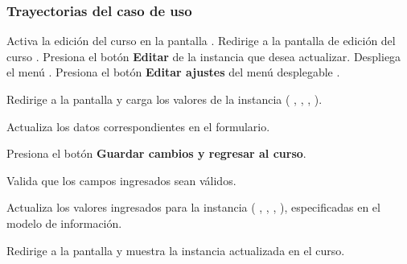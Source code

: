 \begin{UseCase}
{	}








\end{UseCase}

\subsubsection{Trayectorias del caso de uso}

\begin{UCtrayectoria}%
%

    \Actor Activa la edición del curso en la pantalla .
    \Sistema Redirige a la pantalla de edición del curso .
    \Actor Presiona el botón {\bf Editar} de la instancia que desea actualizar.
    \Sistema Despliega el menú .
    \Actor Presiona el botón {\bf Editar ajustes} del menú desplegable .

    \Sistema Redirige a la pantalla  y carga los valores de la instancia  (
      ,
      ,
      ,
      ).

    \label{CU-C02-muestra-pantalla}

    \Actor Actualiza los datos correspondientes en el formulario.

    \Actor Presiona el botón {\bf Guardar cambios y regresar al curso}. 

    \Sistema Valida que los campos ingresados sean válidos.  

    \Sistema Actualiza los valores ingresados para la instancia  (
      ,
      ,
      ,
      ), especificadas en el modelo de información.

    \Sistema Redirige a la pantalla  y muestra la instancia actualizada en el curso.

\end{UCtrayectoria}

